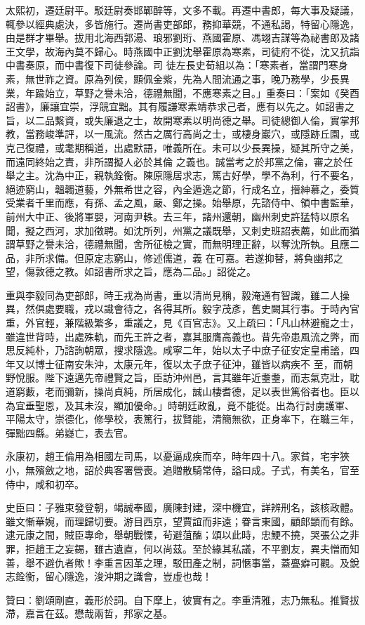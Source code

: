 \begin{pinyinscope}
 太熙初，遷廷尉平。駁廷尉奏邯鄲醉等，文多不載。再遷中書郎，每大事及疑議，輒參以經典處決，多皆施行。遷尚書吏部郎，務抑華競，不通私謁，特留心隱逸，由是群才畢舉。拔用北海西郭湯、琅邪劉珩、燕國霍原、馮翊吉謀等為祕書郎及諸王文學，故海內莫不歸心。時燕國中正劉沈舉霍原為寒素，司徒府不從，沈又抗詣中書奏原，而中書復下司徒參論。司
 徒左長史荀組以為：「寒素者，當謂門寒身素，無世祚之資。原為列侯，顯佩金紫，先為人間流通之事，晚乃務學，少長異業，年踰始立，草野之譽未洽，德禮無聞，不應寒素之目。」重奏曰：「案如《癸酉詔書》，廉讓宜崇，浮競宜黜。其有履謙寒素靖恭求己者，應有以先之。如詔書之旨，以二品繫資，或失廉退之士，故開寒素以明尚德之舉。司徒總御人倫，實掌邦教，當務峻準評，以一風流。然古之厲行高尚之士，或棲身巖穴，或隱跡丘園，或克己復禮，或耄期稱道，出處默語，唯義所在。未可以少長異操，疑其所守之美，而遠同終始之責，非所謂擬人必於其倫
 之義也。誠當考之於邦黨之倫，審之於任舉之主。沈為中正，親執銓衡。陳原隱居求志，篤古好學，學不為利，行不要名，絕迹窮山，韞韣道藝，外無希世之容，內全遁逸之節，行成名立，搢紳慕之，委質受業者千里而應，有孫、孟之風，嚴、鄭之操。始舉原，先諮侍中、領中書監華，前州大中正、後將軍嬰，河南尹軼。去三年，諸州還朝，幽州刺史許猛特以原名聞，擬之西河，求加徵聘。如沈所列，州黨之議既舉，又刺史班詔表薦，如此而猶謂草野之譽未洽，德禮無聞，舍所征檢之實，而無明理正辭，以奪沈所執。且應二品，非所求備。但原定志窮山，修述儒道，義
 在可嘉。若遂抑替，將負幽邦之望，傷敦德之教。如詔書所求之旨，應為二品。」詔從之。



 重與李毅同為吏部郎，時王戎為尚書，重以清尚見稱，毅淹通有智識，雖二人操異，然俱處要職，戎以識會待之，各得其所。毅字茂彥，舊史闕其行事。于時內官重，外官輕，兼階級繁多，重議之，見《百官志》。又上疏曰：「凡山林避寵之士，雖違世背時，出處殊軌，而先王許之者，嘉其服膺高義也。昔先帝患風流之弊，而思反純朴，乃諮詢朝眾，搜求隱逸。咸寧二年，始以太子中庶子征安定皇甫謐，四年又以博士征南安朱沖，太康元年，復以太子庶子征沖，雖皆以病疾不
 至，而朝野悅服。陛下遠邁先帝禮賢之旨，臣訪沖州邑，言其雖年近耋耋，而志氣克壯，耽道窮藪，老而彌新，操尚貞純，所居成化，誠山棲耆德，足以表世篤俗者也。臣以為宜垂聖恩，及其未沒，顯加優命。」時朝廷政亂，竟不能從。出為行討虜護軍、平陽太守，崇德化，修學校，表篤行，拔賢能，清簡無欲，正身率下，在職三年，彈黜四縣。弟嶷亡，表去官。



 永康初，趙王倫用為相國左司馬，以憂逼成疾而卒，時年四十八。家貧，宅宇狹小，無殯斂之地，詔於典客署營喪。追贈散騎常侍，謚曰成。子式，有美名，官至侍中，咸和初卒。



 史臣曰：子雅束發登朝，竭誠奉國，廣陳封建，深中機宜，詳辨刑名，該核政體。雖文慚華婉，而理歸切要。游目西京，望賈誼而非遠；眷言東國，顧郎顗而有餘。逮元康之間，賊臣專命，舉朝戰慄，茍避菹醢；頌以此時，忠鯁不撓，哭張公之非罪，拒趙王之妄錫，雖古遺直，何以尚茲。至於緣其私議，不平劉友，異夫憎而知善，舉不避仇者歟！李重言因革之理，駁田產之制，詞愜事當，蓋亹癖可觀。及銳志銓衡，留心隱逸，浚沖期之識會，豈虛也哉！



 贊曰：劉頌剛直，義形於詞。自下摩上，彼實有之。李重清雅，志乃無私。推賢拔滯，嘉言在茲。懋哉兩哲，邦家之基。



\end{pinyinscope}